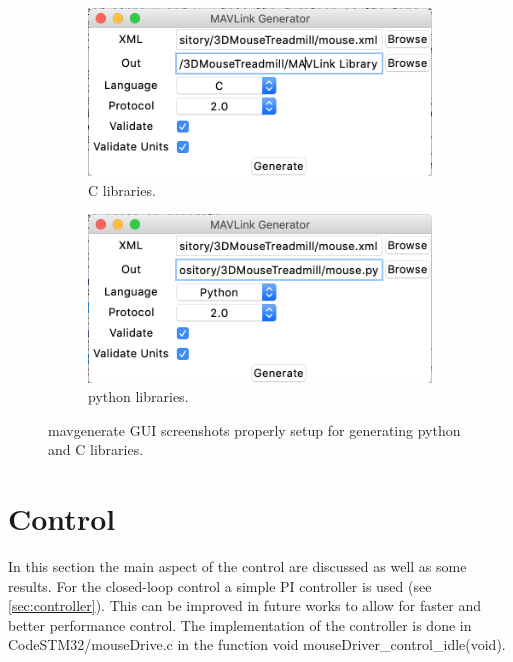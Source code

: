 \documentclass[12pt,a4paper]{article}
\begin{document}
\begin{figure}[H]
	\centering
	\begin{subfigure}[b]{0.4\textwidth}
		\includegraphics[width=\textwidth]{fig/gen_c}
		\caption{C libraries.}
		\label{fig:gen_c}
	\end{subfigure}
	\begin{subfigure}[b]{0.4\textwidth}
		\includegraphics[width=\textwidth]{fig/gen_py}
		\caption{python libraries.}
		\label{fig:gen_py}
	\end{subfigure}
	\caption{mavgenerate GUI screenshots properly setup for generating python and C libraries.}
\end{figure}

\newpage
\section{Control} \label{sec:control}
In this section the main aspect of the control are discussed as well as some results.
For the closed-loop control a simple PI controller is used (see \ref{sec:controller}). This can be improved in future works to allow for faster and better performance control. The implementation of the controller is done in CodeSTM32/mouseDrive.c in the function void mouseDriver\_control\_idle(void). 
\end{document}
